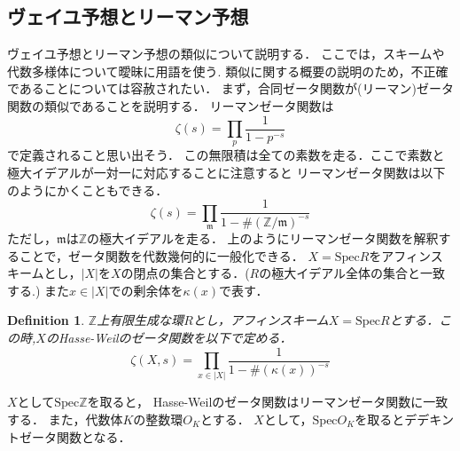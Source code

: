 \documentclass{ujarticle}
\newtheorem{dfn}[thm]{Definition}
\begin{document}
\subsection{ヴェイユ予想とリーマン予想}
\label{sub:ヴェイユ予想とリーマン予想}

ヴェイユ予想とリーマン予想の類似について説明する．
ここでは，スキームや代数多様体について曖昧に用語を使う.
類似に関する概要の説明のため，不正確であることについては容赦されたい．
まず，合同ゼータ関数が(リーマン)ゼータ関数の類似であることを説明する．
リーマンゼータ関数は
\begin{equation*}
 \zeta(s)= \prod_{p}\frac{1}{1-p^{-s}}
\end{equation*}
で定義されること思い出そう．
この無限積は全ての素数を走る．ここで素数と極大イデアルが一対一に対応することに注意すると
リーマンゼータ関数は以下のようにかくこともできる．
\begin{equation*}
 \zeta(s) = \prod_{\mathfrak{m}}
 \frac{1}{1-{\#(\mathbb{Z}/\mathfrak{m})}^{-s}}
\end{equation*}
ただし，$\mathfrak{m}$は$\mathbb{Z}$の極大イデアルを走る．
上のようにリーマンゼータ関数を解釈することで，ゼータ関数を代数幾何的に一般化できる．
$X=\mathrm{Spec}R$をアフィンスキームとし，$|X|$を$X$の閉点の集合とする．($R$の極大イデアル全体の集合と一致する.)
また$x \in |X|$での剰余体を$\kappa(x)$で表す．
\begin{dfn}
  $\mathbb{Z}$上有限生成な環$R$とし，アフィンスキーム$X=\mathrm{Spec}R$とする．この時,$X$のHasse-Weilのゼータ関数を以下で定める．
  \begin{equation*}
   \zeta(X,s)=\prod_{x \in |X|} \frac{1}{1-\#(\kappa(x))^{-s}}
  \end{equation*}
\end{dfn}
$X$として$\mathrm{Spec}\mathbb{Z}$を取ると，
Hasse-Weilのゼータ関数はリーマンゼータ関数に一致する．
また，代数体$K$の整数環$O_K$とする．
$X$として，$\mathrm{Spec}O_K$を取るとデデキントゼータ関数となる．
\end{document}
